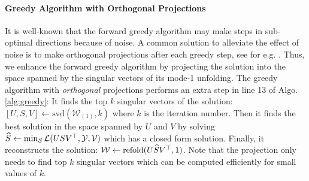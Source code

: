 \paragraph{Greedy Algorithm with Orthogonal Projections} It is well-known that the forward greedy algorithm may make steps in sub-optimal directions because of noise.  A common solution to alleviate the effect of noise is to make orthogonal projections after each greedy step, see for e.g. \cite{Barron2008,Shwartz11}. Thus, we enhance the forward greedy algorithm by projecting the solution into the space spanned by the singular vectors of its mode-1 unfolding. The  greedy algorithm with \textit{orthogonal} projections performs an extra step in line 13 of Algo. \ref{alg:greedy}:  It finds the top $k$ singular vectors of the solution: $[U, S, V] \gets \mathrm{svd}(\mathcal{W}_{(1)}, k)$ where $k$ is the iteration number. Then it finds the best solution in the space spanned by $U$ and $V$ by solving $\widehat{S} \gets \min_{S}\mathcal{L}(USV^{\top}, {\mathcal Y}, {\mathcal V})$ which has a closed form solution. Finally, it reconstructs the solution: ${\mathcal W} \gets \mathrm{refold}(U\widehat{S}V^{\top}, 1)$. Note that the projection only needs to find top $k$ singular vectors which can be computed efficiently for small values of $k$.





